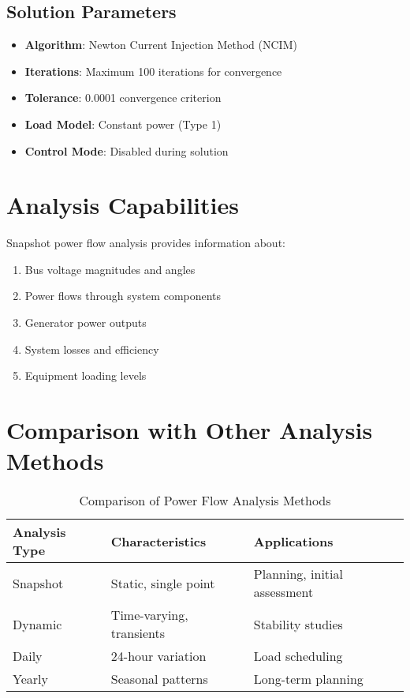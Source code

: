 \documentclass[11pt]{article}
\begin{document}
\subsection{Solution Parameters}
\begin{itemize}
    \item \textbf{Algorithm}: Newton Current Injection Method (NCIM)
    \item \textbf{Iterations}: Maximum 100 iterations for convergence
    \item \textbf{Tolerance}: 0.0001 convergence criterion
    \item \textbf{Load Model}: Constant power (Type 1)
    \item \textbf{Control Mode}: Disabled during solution
\end{itemize}

\section{Analysis Capabilities}
Snapshot power flow analysis provides information about:
\begin{enumerate}
    \item Bus voltage magnitudes and angles
    \item Power flows through system components
    \item Generator power outputs
    \item System losses and efficiency
    \item Equipment loading levels
\end{enumerate}

\section{Comparison with Other Analysis Methods}
\begin{table}[H]
    \centering
    \begin{tabular}{lll}
        \toprule
        Analysis Type & Characteristics & Applications \\
        \midrule
        Snapshot & Static, single point & Planning, initial assessment \\
        Dynamic & Time-varying, transients & Stability studies \\
        Daily & 24-hour variation & Load scheduling \\
        Yearly & Seasonal patterns & Long-term planning \\
        \bottomrule
    \end{tabular}
    \caption{Comparison of Power Flow Analysis Methods}
\end{table}
\end{document}
